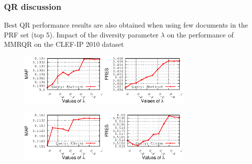 \documentclass[xcolor=x11names,compress]{beamer}
\renewcommand{\(}{\begin{columns}}
\renewcommand{\)}{\end{columns}}
\newcommand{\<}[1]{\begin{column}{#1}}
\renewcommand{\>}{\end{column}}
\begin{document}
\begin{frame}
\frametitle{QR discussion}
Best QR performance results are also obtained when using few
documents in the PRF set (top 5).
Impact of the diversity parameter $\lambda$ on the performance of
MMRQR on the CLEF-IP 2010 dataset

\begin{figure}
\begin{centering}
\includegraphics[width=4.3cm]{../mmrqrResults-lambda/qAbstract-sDescription_MAP_2010}\includegraphics[width=4.3cm]{../mmrqrResults-lambda/qAbstract-sDescription_PRES_2010}
\par\end{centering}

\begin{centering}
\includegraphics[width=4.3cm]{../mmrqrResults-lambda/qClaims-sDescription_MAP_2010}\includegraphics[width=4.3cm]{../mmrqrResults-lambda/qClaims-sDescription_PRES_2010}
\par\end{centering}
\end{figure}
\end{frame}
\end{document}
